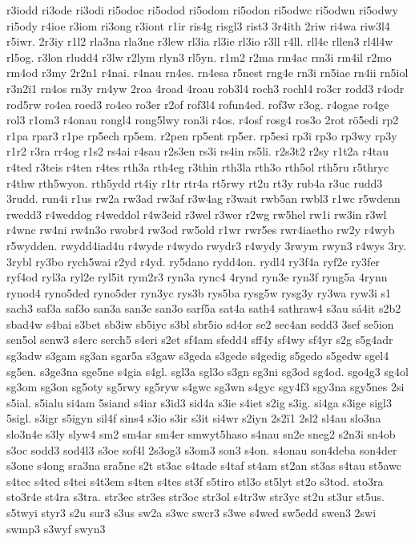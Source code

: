 {r3iodd
ri3ode
ri3odi
ri5odoc
ri5odod
ri5odom
ri5odon
ri5odwc
ri5odwn
ri5odwy
ri5ody
r4ioe
r3iom
ri3ong
r3iont
r1ir
ris4g
risgl3
rist3
3r4ith
2riw
ri4wa
riw3l4
r5iwr.
2r3iy
r1l2
rla3na
rla3ne
r3lew
rl3ia
rl3ie
rl3io
r3ll
r4ll.
rll4e
rllen3
rl4l4w
rl5og.
r3lon
rludd4
r3lw
r2lym
rlyn3
rl5yn.
r1m2
r2ma
rm4ac
rm3i
rm4il
r2mo
rm4od
r3my
2r2n1
r4nai.
r4nau
rn4es.
rn4esa
r5nest
rng4e
rn3i
rn5iae
rn4ii
rn5iol
r3n2ï1
rn4os
rn3y
rn4yw
2roa
4road
4roau
rob3l4
roch3
rochl4
ro3cr
rodd3
r4odr
rod5rw
ro4ea
roed3
ro4eo
ro3er
r2of
rof3l4
rofun4ed.
rof3w
r3og.
r4ogae
ro4ge
rol3
r1om3
r4onau
rongl4
rong5lwy
ron3i
r4os.
r4osf
rosg4
ros3o
2rot
rö5edi
rp2
r1pa
rpar3
r1pe
rp5ech
rp5em.
r2pen
rp5ent
rp5er.
rp5esi
rp3i
rp3o
rp3wy
rp3y
r1r2
r3ra
rr4og
r1s2
rs4ai
r4sau
r2s3en
rs3i
rs4in
rs5li.
r2s3t2
r2sy
r1t2a
r4tau
r4ted
r3teis
r4ten
r4tes
rth3a
rth4eg
r3thin
rth3la
rth3o
rth5ol
rth5ru
r5thryc
r4thw
rth5wyon.
rth5ydd
rt4iy
r1tr
rtr4a
rt5rwy
rt2u
rt3y
rub4a
r3uc
rudd3
3rudd.
run4i
r1us
rw2a
rw3ad
rw3af
r3w4ag
r3wait
rwb5an
rwbl3
r1wc
r5wdenn
rwedd3
r4weddog
r4weddol
r4w3eid
r3wel
r3wer
r2wg
rw5hel
rw1i
rw3in
r3wl
r4wnc
rw4ni
rw4n3o
rwobr4
rw3od
rw5old
r1wr
rwr5es
rwr4iaetho
rw2y
r4wyb
r5wydden.
rwydd4iad4u
r4wyde
r4wydo
rwydr3
r4wydy
3rwym
rwyn3
r4wys
3ry.
3rybl
ry3bo
rych5wai
r2yd
r4yd.
ry5dano
rydd4on.
rydl4
ry3f4a
ryf2e
ry3fer
ryf4od
ryl3a
ryl2e
ryl5it
rym2r3
ryn3a
rync4
4rynd
ryn3e
ryn3f
ryng5a
4rynn
rynod4
ryno5ded
ryno5der
ryn3yc
rys3b
rys5ba
rysg5w
rysg3y
ry3wa
ryw3i
s1
sach3
saf3a
saf3o
san3a
san3e
san3o
sarf5a
sat4a
sath4
sathraw4
s3au
sá4it
s2b2
sbad4w
s4bai
s3bet
sb3iw
sb5iyc
s3bl
sbr5io
sd4or
se2
sec4an
sedd3
3sef
se5ion
sen5ol
senw3
s4erc
serch5
s4eri
s2et
sf4am
sfedd4
sff4y
sf4wy
sf4yr
s2g
s5g4adr
sg3adw
s3gam
sg3an
sgar5a
s3gaw
s3geda
s3gede
s4gedig
s5gedo
s5gedw
sgel4
sg5en.
s3ge3na
sge5ne
s4gia
s4gl.
sgl3a
sgl3o
s3gn
sg3ni
sg3od
sg4od.
sgo4g3
sg4ol
sg3om
sg3on
sg5oty
sg5rwy
sg5ryw
s4gwc
sg3wn
s4gyc
sgy4f3
sgy3na
sgy5nes
2si
s5ial.
s5ialu
si4am
5siand
s4iar
s3id3
sid4a
s3ie
s4iet
s2ig
s3ig.
si4ga
s3ige
sigl3
5sigl.
s3igr
s5igyn
sil4f
sins4
s3io
s3ir
s3it
si4wr
s2iyn
2s2ï1
2sl2
sl4au
slo3na
slo3n4e
s3ly
slyw4
sm2
sm4ar
sm4er
smwyt5haso
s4nau
sn2e
sneg2
s2n3i
sn4ob
s3oc
sodd3
sod4l3
s3oe
sof4l
2s3og3
s3om3
son3
s4on.
s4onau
son4deba
son4der
s3one
s4ong
sra3na
sra5ne
s2t
st3ac
s4tade
s4taf
st4am
st2an
st3as
s4tau
st5awc
s4tec
s4ted
s4tei
s4t3em
s4ten
s4tes
st3f
s5tiro
stl3o
st5lyt
st2o
s3tod.
sto3ra
sto3r4e
st4ra
s3tra.
str3ec
str3es
str3oc
str3ol
s4tr3w
str3yc
st2u
st3ur
st5us.
s5twyi
styr3
s2u
sur3
s3us
sw2a
s3wc
swcr3
s3we
s4wed
sw5edd
swen3
2swi
swmp3
s3wyf
swyn3
}
